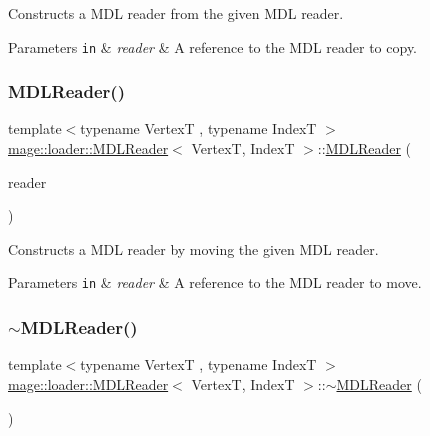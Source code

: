 Constructs a M\+DL reader from the given M\+DL reader.


\begin{DoxyParams}[1]{Parameters}
\mbox{\tt in}  & {\em reader} & A reference to the M\+DL reader to copy. \\
\hline
\end{DoxyParams}
\hypertarget{classmage_1_1loader_1_1_m_d_l_reader_a807457ff831a678f6fa20de8490d3d43}{}\label{classmage_1_1loader_1_1_m_d_l_reader_a807457ff831a678f6fa20de8490d3d43} 
\subsubsection{\texorpdfstring{M\+D\+L\+Reader()}{MDLReader()}\hspace{0.1cm}{\footnotesize\ttfamily [3/3]}}
{\footnotesize\ttfamily template$<$typename VertexT , typename IndexT $>$ \\
\hyperlink{classmage_1_1loader_1_1_m_d_l_reader}{mage\+::loader\+::\+M\+D\+L\+Reader}$<$ VertexT, IndexT $>$\+::\hyperlink{classmage_1_1loader_1_1_m_d_l_reader}{M\+D\+L\+Reader} (\begin{DoxyParamCaption}\item[{\hyperlink{classmage_1_1loader_1_1_m_d_l_reader}{M\+D\+L\+Reader}$<$ VertexT, IndexT $>$ \&\&}]{reader }\end{DoxyParamCaption})\hspace{0.3cm}{\ttfamily [noexcept]}}

Constructs a M\+DL reader by moving the given M\+DL reader.


\begin{DoxyParams}[1]{Parameters}
\mbox{\tt in}  & {\em reader} & A reference to the M\+DL reader to move. \\
\hline
\end{DoxyParams}
\hypertarget{classmage_1_1loader_1_1_m_d_l_reader_af42e18c59fe48c3ad61362edcd955939}{}\label{classmage_1_1loader_1_1_m_d_l_reader_af42e18c59fe48c3ad61362edcd955939} 
\subsubsection{\texorpdfstring{$\sim$\+M\+D\+L\+Reader()}{~MDLReader()}}
{\footnotesize\ttfamily template$<$typename VertexT , typename IndexT $>$ \\
\hyperlink{classmage_1_1loader_1_1_m_d_l_reader}{mage\+::loader\+::\+M\+D\+L\+Reader}$<$ VertexT, IndexT $>$\+::$\sim$\hyperlink{classmage_1_1loader_1_1_m_d_l_reader}{M\+D\+L\+Reader} (\begin{DoxyParamCaption}{ }\end{DoxyParamCaption})}

